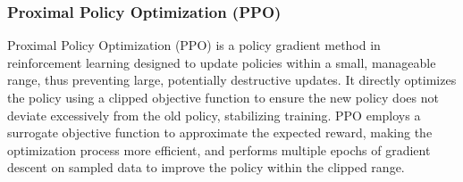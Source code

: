 \documentclass[conference]{IEEEtran}
\begin{document}


\subsubsection{\textbf{Proximal Policy Optimization (PPO)}}
Proximal Policy Optimization (PPO) \cite{schulman2017proximal} is a policy gradient method in reinforcement learning designed to update policies within a small, manageable range, thus preventing large, potentially destructive updates. It directly optimizes the policy using a clipped objective function to ensure the new policy does not deviate excessively from the old policy, stabilizing training. PPO employs a surrogate objective function to approximate the expected reward, making the optimization process more efficient, and performs multiple epochs of gradient descent on sampled data to improve the policy within the clipped range. %
\end{document}
